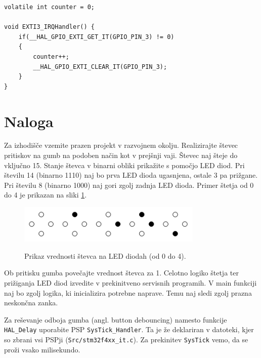 \documentclass[12pt,letterpaper]{article}
\begin{document}
\begin{center}
\begin{lstlisting}[style=CStyle]
volatile int counter = 0;

void EXTI3_IRQHandler() {
	if(__HAL_GPIO_EXTI_GET_IT(GPIO_PIN_3) != 0)
	{
		counter++;
		__HAL_GPIO_EXTI_CLEAR_IT(GPIO_PIN_3);
	}
}
\end{lstlisting}
\end{center}

\newpage


\section*{Naloga}

Za izhodišče vzemite prazen projekt v razvojnem okolju. Realizirajte števec pritiskov na gumb na podoben način kot v prejšnji vaji. Števec naj šteje do vključno 15. Stanje števca v binarni obliki prikažite s pomočjo LED diod. Pri številu 14 (binarno 1110) naj bo prva LED dioda ugasnjena, ostale 3 pa prižgane. Pri številu 8 (binarno 1000) naj gori zgolj zadnja LED dioda. Primer štetja od 0 do 4 je prikazan na sliki \ref{LedStevec}.

\begin{figure}[ht!]
  \centering
  \caption{Prikaz vrednosti števca na LED diodah (od 0 do 4).}
  \includegraphics[width=250pt]{images/vaja4/ledstevec.png}
  \label{LedStevec}
\end{figure}

Ob pritisku gumba povečajte vrednost števca za 1. Celotno logiko štetja ter prižiganja LED diod izvedite v prekinitveno servisnih programih. V main funkciji naj bo zgolj logika, ki inicializira potrebne naprave. Temu naj sledi zgolj prazna neskončna zanka.

Za reševanje odboja gumba (angl. button debouncing) namesto funkcije \texttt{HAL\_Delay} uporabite PSP \texttt{SysTick\_Handler}. Ta je že deklariran v datoteki, kjer so zbrani vsi PSPji (\texttt{Src/stm32f4xx\_it.c}). Za prekinitev \texttt{SysTick} vemo, da se proži vsako milisekundo.
\end{document}
